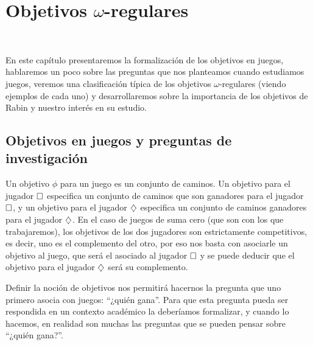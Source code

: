 \chapter{Objetivos $\omega$-regulares}
~\label{cap:objetivos}


En este capítulo presentaremos la formalización de los objetivos en juegos,
hablaremos un poco sobre las preguntas que nos planteamos cuando estudiamos
juegos, veremos una clasificación típica de los objetivos $\omega$-regulares
(viendo ejemplos de cada uno) y desarrollaremos sobre la importancia de los
objetivos de Rabin y nuestro interés en su estudio.

\section{Objetivos en juegos y preguntas de investigación}

Un objetivo $\phi$ para un juego es un conjunto de caminos. Un objetivo para el
jugador $\square$ especifica un conjunto de caminos que son ganadores para el
jugador $\square$, y un objetivo para el jugador $\diamondsuit$ especifica un conjunto
de caminos ganadores para el jugador $\diamondsuit$. En el caso de juegos de suma cero
(que son con los que trabajaremos), los objetivos de los dos jugadores son
estrictamente competitivos, es decir, uno es el complemento del otro, por eso
nos basta con asociarle un objetivo al juego, que será el asociado al jugador
$\square$ y se puede deducir que el objetivo para el jugador $\diamondsuit$ será su
complemento.


Definir la noción de objetivos nos permitirá hacernos la pregunta que uno
primero asocia con juegos: ``¿quién gana''. Para que esta pregunta pueda ser
respondida en un contexto académico la deberíamos formalizar, y cuando lo
hacemos, en realidad son muchas las preguntas que se pueden pensar sobre
``¿quién gana?''.

